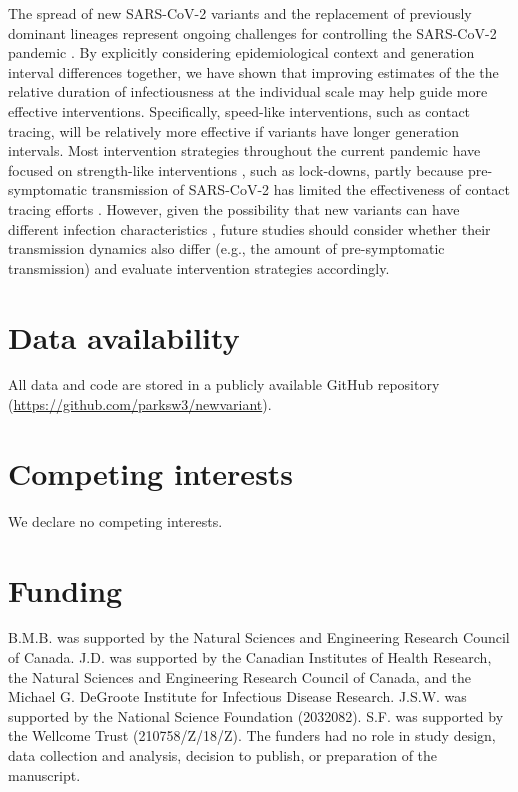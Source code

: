 \documentclass[12pt]{article}
\begin{document}
The spread of new SARS-CoV-2 variants and the replacement of previously dominant lineages represent ongoing challenges for controlling the SARS-CoV-2 pandemic \citep{abdool2021new,fontanet2021sars,walensky2021sars}.  
By explicitly considering epidemiological context and generation interval differences together, we have shown that improving estimates of the the relative duration of infectiousness at the individual scale may help guide more effective interventions. 
Specifically, speed-like interventions, such as contact tracing, will be relatively more effective if variants have longer generation intervals.
Most intervention strategies throughout the current pandemic have focused on strength-like interventions \citep{flaxman2020Rt}, such as lock-downs, partly because pre-symptomatic transmission of SARS-CoV-2 has limited the effectiveness of contact tracing efforts \citep{hellewell2020feasibility}.
However, given the possibility that new variants can have different infection characteristics \citep{kissler2021densely}, future studies should consider whether their transmission dynamics also differ (e.g., the amount of pre-symptomatic transmission) and evaluate intervention strategies accordingly.

\section*{Data availability}

All data and code are stored in a publicly available GitHub repository (\url{https://github.com/parksw3/newvariant}).

\section*{Competing interests}

We declare no competing interests.

\section*{Funding}

B.M.B. was supported by the Natural Sciences and Engineering Research Council of Canada. 
J.D. was supported by the Canadian Institutes of Health Research, 
the Natural Sciences and Engineering Research Council of Canada, 
and the Michael G. DeGroote Institute for Infectious Disease Research.
J.S.W. was supported by the National Science Foundation (2032082).
S.F. was supported by the Wellcome Trust (210758/Z/18/Z).
The funders had no role in study design, data collection and analysis, decision to publish, or preparation of the manuscript.

\pagebreak


\end{document}
